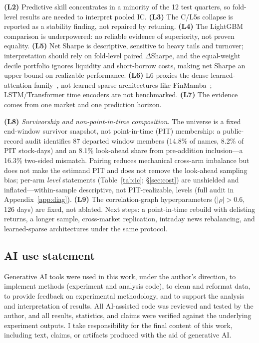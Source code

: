 \documentclass{article}
\begin{document}
\textbf{(L2)} Predictive skill concentrates in a minority of the 12 test quarters, so fold-level results are needed to interpret pooled IC. \textbf{(L3)} The C/L5s collapse is reported as a stability finding, not repaired by retuning. \textbf{(L4)} The LightGBM comparison is underpowered: no reliable evidence of superiority, not proven equality. \textbf{(L5)} Net Sharpe is descriptive, sensitive to heavy tails and turnover; interpretation should rely on fold-level paired $\Delta$Sharpe, and the equal-weight decile portfolio ignores liquidity and short-borrow costs, making net Sharpe an upper bound on realizable performance. \textbf{(L6)} L6 proxies the dense learned-attention family~\citep{li2024master,cheng2021adgat}, not learned-sparse architectures like FinMamba~\citep{finmamba2025}; LSTM/Transformer time encoders are not benchmarked. \textbf{(L7)} The evidence comes from one market and one prediction horizon.

\textbf{(L8)} \emph{Survivorship and non-point-in-time composition.} The universe is a fixed end-window survivor snapshot, not point-in-time (PIT) membership: a public-record audit identifies 87 departed window members (14.8\% of names, 8.2\% of PIT stock-days) and an 8.1\% look-ahead share from pre-addition inclusion---a 16.3\% two-sided mismatch. Pairing reduces mechanical cross-arm imbalance but does not make the estimand PIT and does not remove the look-ahead sampling bias; per-arm \emph{level} statements (Table~\ref{tab:ic}; \S\ref{sec:cost}) are unshielded and inflated---within-sample descriptive, not PIT-realizable, levels (full audit in Appendix~\ref{app:diag}). \textbf{(L9)} The correlation-graph hyperparameters ($|\rho|>0.6$, 126 days) are fixed, not ablated. Next steps: a point-in-time rebuild with delisting returns, a longer sample, cross-market replication, intraday news rebalancing, and learned-sparse architectures under the same protocol.

\subsection*{AI use statement}
Generative AI tools were used in this work, under the author's direction, to implement methods (experiment and analysis code), to clean and reformat data, to provide feedback on experimental methodology, and to support the analysis and interpretation of results. All AI-assisted code was reviewed and tested by the author, and all results, statistics, and claims were verified against the underlying experiment outputs. I take responsibility for the final content of this work, including text, claims, or artifacts produced with the aid of generative AI.
\end{document}
